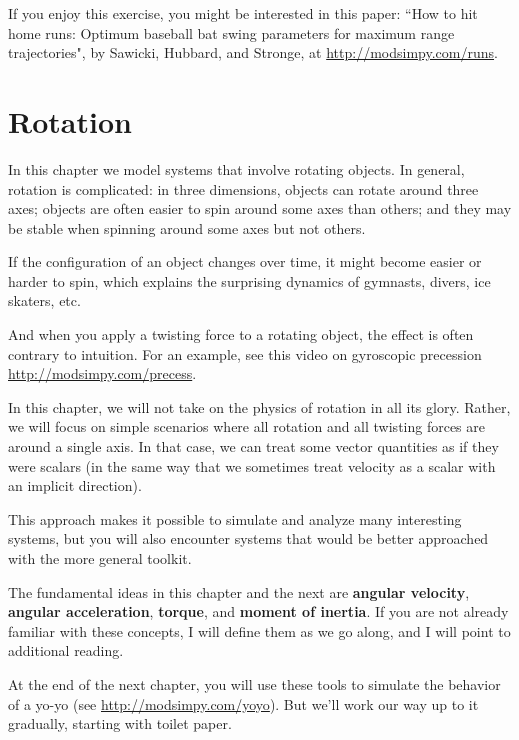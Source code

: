 \documentclass[12pt]{book}
\theoremstyle{exercise}
\begin{document}
If you enjoy this exercise, you might be interested in this paper: ``How to hit home runs: Optimum baseball bat swing parameters for maximum range trajectories", by Sawicki, Hubbard, and Stronge, at \url{http://modsimpy.com/runs}.


\chapter{Rotation}
\label{chap24}

In this chapter we model systems that involve rotating objects.  In general, rotation is complicated:  in three dimensions, objects can rotate around three axes; objects are often easier to spin around some axes than others; and they may be stable when spinning around some axes but not others.


If the configuration of an object changes over time, it might become easier or harder to spin, which explains the surprising dynamics of gymnasts, divers, ice skaters, etc.

And when you apply a twisting force to a rotating object, the effect is often contrary to intuition.  For an example, see this video on gyroscopic precession \url{http://modsimpy.com/precess}.


In this chapter, we will not take on the physics of rotation in all its glory.  Rather, we will focus on simple scenarios where all rotation and all twisting forces are around a single axis.  In that case, we can treat some vector quantities as if they were scalars (in the same way that we sometimes treat velocity as a scalar with an implicit direction).


This approach makes it possible to simulate and analyze many interesting systems, but you will also encounter systems that would be better approached with the more general toolkit.

The fundamental ideas in this chapter and the next are {\bf angular velocity}, {\bf angular acceleration}, {\bf torque}, and {\bf moment of inertia}.  If you are not already familiar with these concepts, I will define them as we go along, and I will point to additional reading.

At the end of the next chapter, you will use these tools to simulate the behavior of a yo-yo (see \url{http://modsimpy.com/yoyo}).  But we'll work our way up to it gradually, starting with toilet paper.
\end{document}
